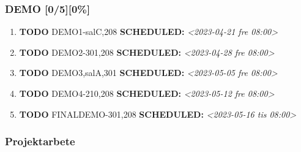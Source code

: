 \documentclass[11pt]{article}
\begin{document}
\subsubsection{DEMO [0/5][0\%]}
\label{sec:orgadcba75}
\begin{enumerate}
\item {\bfseries\sffamily TODO} DEMO1-salC,208
\label{sec:org37b80b5}
\noindent\textbf{SCHEDULED:} \textit{<2023-04-21 fre 08:00>}\\[0pt]
\item {\bfseries\sffamily TODO} DEMO2-301,208
\label{sec:org30192af}
\noindent\textbf{SCHEDULED:} \textit{<2023-04-28 fre 08:00>}\\[0pt]
\item {\bfseries\sffamily TODO} DEMO3,salA,301
\label{sec:org77a4804}
\noindent\textbf{SCHEDULED:} \textit{<2023-05-05 fre 08:00>}\\[0pt]
\item {\bfseries\sffamily TODO} DEMO4-210,208
\label{sec:org5329c7b}
\noindent\textbf{SCHEDULED:} \textit{<2023-05-12 fre 08:00>}\\[0pt]
\item {\bfseries\sffamily TODO} FINALDEMO-301,208
\label{sec:org6b193fa}
\noindent\textbf{SCHEDULED:} \textit{<2023-05-16 tis 08:00>}\\[0pt]
\end{enumerate}

\subsubsection{Projektarbete}
\label{sec:org218f27e}
\end{document}
